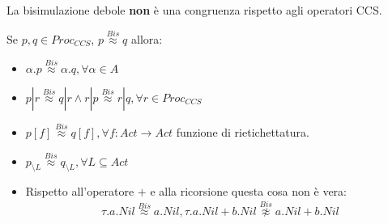 La bisimulazione debole \textbf{non} è una congruenza rispetto agli operatori CCS.
\begin{teorema}
    Se $p, q \in Proc_{CCS}$, $p \stackrel{Bis}{\approx} q$ allora:
    \begin{itemize}
        \item $\alpha . p \stackrel{Bis}{\approx} \alpha . q, \forall \alpha \in A$
        \item $p | r \stackrel{Bis}{\approx} q | r \land r | p \stackrel{Bis}{\approx}
                  r | q, \forall r \in Proc_{CCS}$
        \item $p[f] \stackrel{Bis}{\approx} q[f], \forall f: Act \to Act$ funzione
              di rietichettatura.
        \item $p_{\setminus L} \stackrel{Bis}{\approx} q_{\setminus L}, \forall
                  L \subseteq Act$
        \item Rispetto all'operatore $+$ e alla ricorsione questa cosa non è vera:
              \begin{equation}
                  \tau . a . Nil \stackrel{Bis}{\approx} a.Nil, \tau . a . Nil + b.Nil
                  \stackrel{Bis}{\not\approx} a.Nil + b.Nil
              \end{equation}
    \end{itemize}
\end{teorema}
